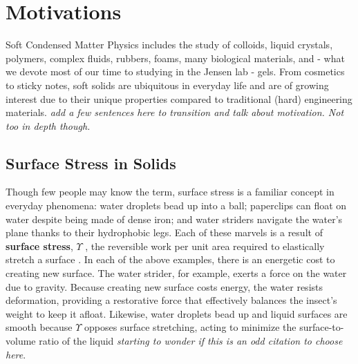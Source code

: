 

\section{Motivations}
Soft Condensed Matter Physics includes the study of colloids, liquid crystals, polymers, complex fluids, rubbers, foams, many biological materials, and - what we devote most of our time to studying in the Jensen lab - gels. From cosmetics to sticky notes, soft solids are ubiquitous in everyday life and are of growing interest due to their unique properties compared to traditional (hard) engineering materials. \emph{add a few sentences here to transition and talk about motivation. Not too in depth though.}

\subsection{Surface Stress in Solids}
Though few people may know the term, surface stress is a familiar concept in everyday phenomena: water droplets bead up into a ball; paperclips can float on water despite being made of dense iron; and water striders navigate the water's plane thanks to their hydrophobic legs. Each of these marvels is a result of \textbf{surface stress}, $\Upsilon$ , the reversible work per unit area required to elastically stretch a surface \cite{cammarata1994surface}. In each of the above examples, there is an energetic cost to creating new surface. The water strider, for example, exerts a force on the water due to gravity. Because creating new surface costs energy, the water resists deformation, providing a restorative force that effectively balances the insect’s weight to keep it afloat.  Likewise, water droplets bead up and liquid surfaces are smooth because $\Upsilon$ opposes surface stretching, acting to minimize the surface-to-volume ratio of the liquid \cite{gibbs1906scientific} \emph{starting to wonder if this is an odd citation to choose here}.


